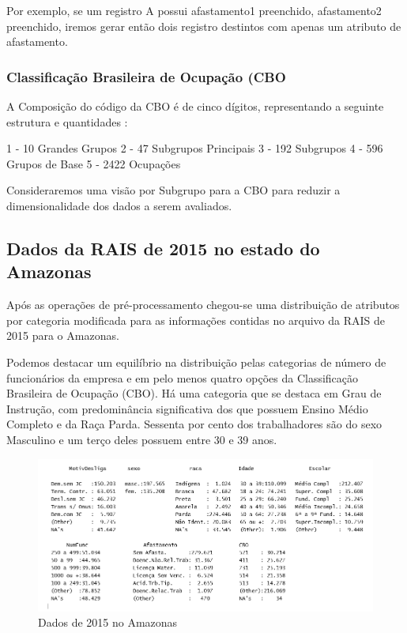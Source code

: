 \documentclass[12pt]{article}
\begin{document}
Por exemplo, se um registro A possui afastamento1 preenchido, afastamento2 preenchido, iremos gerar então dois registro destintos com apenas um atributo de afastamento.

\subsubsection{Classificação Brasileira de Ocupação (CBO}

A Composição do código da CBO é de cinco dígitos, representando a seguinte estrutura e quantidades :

 1 - 10 Grandes Grupos
 2 - 47 Subgrupos Principais
 3 - 192 Subgrupos
 4 - 596 Grupos de Base
 5 - 2422 Ocupações
 
 Consideraremos uma visão por Subgrupo para a CBO para reduzir a dimensionalidade dos dados a serem avaliados.

\subsection{Dados da RAIS de 2015 no estado do Amazonas}

Após as operações de pré-processamento chegou-se uma distribuição de atributos por categoria modificada para as informações contidas no arquivo da RAIS de 2015 para o Amazonas.

Podemos destacar um equilíbrio na distribuição pelas categorias de número de funcionários da empresa e em pelo menos quatro opções da Classificação Brasileira de Ocupação (CBO). Há uma categoria que se destaca em Grau de Instrução, com predominância significativa dos que possuem Ensino Médio Completo e da Raça Parda. Sessenta por cento dos trabalhadores são do sexo Masculino e um terço deles possuem entre 30 e 39 anos. 

\FloatBarrier
\begin{figure}[!htb]
\centering
\includegraphics[width=1.1\textwidth]{resultado_base.png}
\caption{Dados de 2015 no Amazonas}
\label{fig:exampleFig5}
\end{figure}
\end{document}

